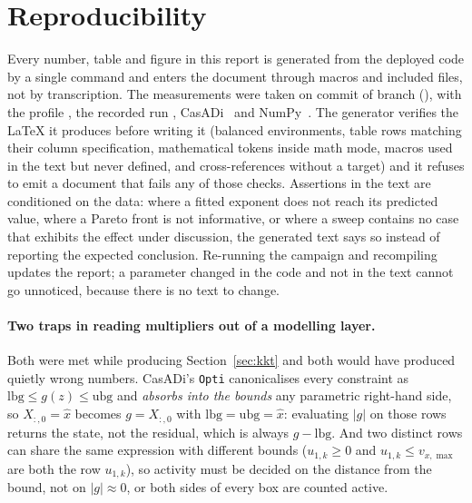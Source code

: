 \documentclass[11pt,a4paper]{article}
\begin{document}
\section*{Reproducibility}

Every number, table and figure in this report is generated from the deployed code by a single command and
enters the document through macros and included files, not by transcription. The measurements were taken on
commit \texttt{\resCommit} of branch \texttt{\resBranch} (\resDate), with the profile \resProfile{}, the
recorded run \resBag, CasADi~\resCasadi{} and NumPy~\resNumpy. The generator verifies the LaTeX it produces
before writing it (balanced environments, table rows matching their column specification, mathematical
tokens inside math mode, macros used in the text but never defined, and cross-references without a target)
and it refuses to emit a document that fails any of those checks. Assertions in the text are conditioned on
the data: where a fitted exponent does not reach its predicted value, where a Pareto front is not
informative, or where a sweep contains no case that exhibits the effect under discussion, the generated text
says so instead of reporting the expected conclusion. Re-running the campaign and recompiling updates the
report; a parameter changed in the code and not in the text cannot go unnoticed, because there is no text to
change.

\paragraph{Two traps in reading multipliers out of a modelling layer.} Both were met while producing
Section~\ref{sec:kkt} and both would have produced quietly wrong numbers. CasADi's \texttt{Opti}
canonicalises every constraint as $\mathrm{lbg}\le g(z)\le\mathrm{ubg}$ and \emph{absorbs into the bounds}
any parametric right-hand side, so $X_{:,0}=\hat x$ becomes $g=X_{:,0}$ with
$\mathrm{lbg}=\mathrm{ubg}=\hat x$: evaluating $|g|$ on those rows returns the state, not the residual, which
is always $g-\mathrm{lbg}$. And two distinct rows can share the same expression with different bounds
($u_{1,k}\ge0$ and $u_{1,k}\le v_{x,\max}$ are both the row $u_{1,k}$), so activity must be decided on the
distance from the bound, not on $|g|\approx0$, or both sides of every box are counted active.

\newpage

\end{document}

